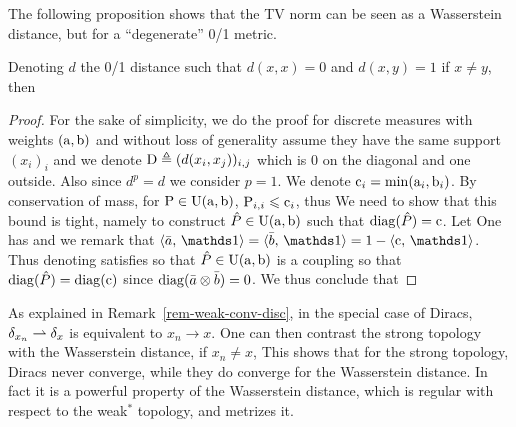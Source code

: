 The following proposition shows that the TV norm can be seen as a Wasserstein distance, but for a ``degenerate'' 0/1 metric.

\begin{prop}\label{prop-rel-wass-tv}
	Denoting $d$ the 0/1 distance such that $d(x,x)=0$ and $d(x,y)=1$ if $x \neq y$, then 
\end{prop}
\begin{proof}
	For the sake of simplicity, we do the proof for discrete measures with weights $(\a,\b)$ and without loss of generality assume they have the same support $(x_i)_i$ and we denote $\D \triangleq (d(x_i,x_j))_{i,j}$ which is 0 on the diagonal and one outside. 
	Also since $d^p=d$ we consider $p=1$. 
	We denote $\text{c}_i = \min(\a_i,\b_i)$.
	By conservation of mass, for $\P \in \CouplingsD(\a,\b)$, $\P_{i,i} \leq \text{c}_i$, thus
	We need to show that this bound is tight, namely to construct $\hat P \in \CouplingsD(\a,\b)$ such that 
	$\diag(\hat P)=\text{c}$. Let 
	One has 
	and we remark that $\dotp{\bar a}{\ones} = \dotp{\bar b}{\ones} = 1-\dotp{\text{c}}{\ones}$.
	Thus denoting 
	satisfies 
	so that $\hat P \in \CouplingsD(\a,\b)$  is a coupling so that $\diag(\hat P) = \diag(\text{c})$ since $\diag( \bar a \otimes \bar b )=0$. We thus conclude that
\end{proof}




As explained in Remark~\ref{rem-weak-conv-disc}, in the special case of Diracs, $\de_{x_n} \rightharpoonup \de_x$  is equivalent to $x_n \rightarrow x$. One can then contrast the strong topology with the Wasserstein distance, if $x_n \neq x$, 
This shows that for the strong topology, Diracs never converge, while they do converge for the Wasserstein distance. In fact it is a powerful property of the Wasserstein distance, which is regular with respect to the weak$^*$ topology, and metrizes it.

